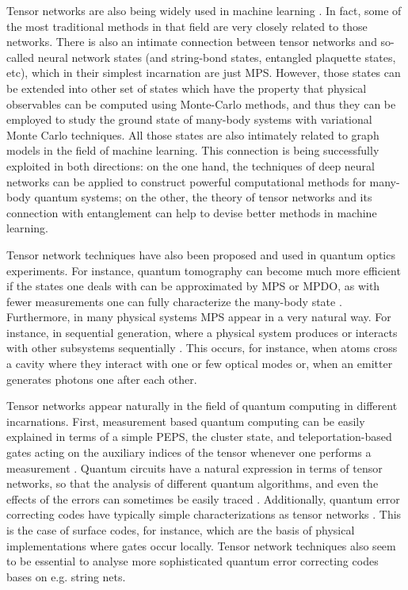 \documentclass[rmp,aps,reprint,superscriptaddress,nobalancelastpage]{revtex4-1}
\begin{document}
    Tensor networks are also being widely used in machine learning \cite{huggins2019towards,stoudenmire2016supervised,carleo2019machine,glasser2019expressive,glasser2018supervised}. In fact, some of the most traditional methods in that field are very closely related to those networks. There is also an intimate connection between tensor networks and so-called neural network states (and string-bond states, entangled plaquette states, etc), which in their simplest incarnation are just MPS. However, those states can be extended into other set of states which have the property that physical observables can be computed using Monte-Carlo methods, and thus they can be employed to study the ground state of many-body systems with variational Monte Carlo techniques. All those states are also intimately related to graph models in the field of machine learning. This connection is being successfully exploited in both directions: on the one hand, the techniques of deep neural networks can be applied to construct powerful computational methods for many-body quantum systems; on the other, the theory of tensor networks and its connection with entanglement can help to devise better methods in machine learning.

    Tensor network techniques have also been proposed and used in quantum optics experiments. For instance, quantum tomography can become much more efficient if the states one deals with can be approximated by MPS or MPDO, as with fewer measurements one can fully characterize the many-body state \cite{cramer2010efficient}. Furthermore, in many physical systems MPS appear in a very natural way. For instance, in sequential generation, where a physical system produces or interacts with other subsystems sequentially \cite{schoen:hen-and-egg,osborne2010holographic}. This occurs, for instance, when atoms cross a cavity where they interact with one or few optical modes or, when an emitter generates photons one after each other.

    Tensor networks appear naturally in the field of quantum computing in different incarnations. First, measurement based quantum computing can be easily explained in terms of a simple PEPS, the cluster state, and teleportation-based gates acting on the auxiliary indices of the tensor whenever one performs a measurement \cite{verstraete:mbc-peps}. Quantum circuits have a natural expression in terms of tensor networks, so that the analysis of different quantum algorithms, and even the effects of the errors can sometimes be easily traced \cite{nielsen-chuang}. Additionally, quantum error correcting codes have typically simple characterizations as tensor networks \cite{terhal2015quantum}. This is the case of surface codes, for instance, which are the basis of physical implementations where gates occur locally. Tensor network techniques also seem to be essential to analyse more sophisticated quantum error correcting codes bases on e.g. string nets.
\end{document}
